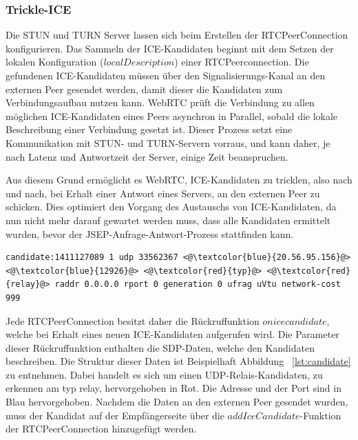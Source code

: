 \subsubsection{Trickle-ICE}
Die \acs{STUN} und \acs{TURN} Server lassen sich beim Erstellen der RTCPeerConnection konfigurieren. Das Sammeln der \acs{ICE}-Kandidaten beginnt mit dem Setzen der lokalen Konfiguration ($localDescription$) einer RTCPeerconnection. Die gefundenen \acs{ICE}-Kandidaten müssen über den Signalisierungs-Kanal an den externen Peer gesendet werden, damit dieser die Kandidaten zum Verbindungsaufbau nutzen kann. \acs{WebRTC} prüft die Verbindung zu allen möglichen \acs{ICE}-Kandidaten eines Peers asynchron in Parallel, sobald die lokale Beschreibung einer Verbindung gesetzt ist. Dieser Prozess setzt eine Kommunikation mit \acs{STUN}- und \acs{TURN}-Servern vorraus, und kann daher, je nach Latenz und Antwortzeit der Server, einige Zeit beanspruchen.\par

Aus diesem Grund ermöglicht es \acs{WebRTC}, \acs{ICE}-Kandidaten zu \glqq{}tricklen\grqq{}, also nach und nach, bei Erhalt einer Antwort eines Servers, an den externen Peer zu schicken. Dies optimiert den Vorgang des Austauschs von \acs{ICE}-Kandidaten, da nun nicht mehr darauf gewartet werden muss, dass alle Kandidaten ermittelt wurden, bevor der \acs{JSEP}-Anfrage-Antwort-Prozess stattfinden kann.\par

\vspace{1pc}
\begin{lstlisting}[caption={SDP-Datenstring eines Relais-ICE-Kandidaten},captionpos=b,label={lst:candidate}]
candidate:1411127089 1 udp 33562367 <@\textcolor{blue}{20.56.95.156}@> <@\textcolor{blue}{12926}@> <@\textcolor{red}{typ}@> <@\textcolor{red}{relay}@> raddr 0.0.0.0 rport 0 generation 0 ufrag uVtu network-cost 999
\end{lstlisting}

Jede RTCPeerConnection besitzt daher die Rückruffunktion \glqq{}$onicecandidate$\grqq{}, welche bei Erhalt eines neuen \acs{ICE}-Kandidaten aufgerufen wird. Die Parameter dieser Rückruffunktion enthalten die \acs{SDP}-Daten, welche den Kandidaten beschreiben. Die Struktur dieser Daten ist Beispielhaft Abbildung ~\ref{lst:candidate} zu entnehmen. Dabei handelt es sich um einen \acs{UDP}-Relais-Kandidaten, zu erkennen am \glqq{}typ relay\grqq{}, hervorgehoben in Rot. Die Adresse und der Port sind in Blau hervorgehoben. Nachdem die Daten an den externen Peer gesendet wurden, muss der Kandidat auf der Empfängerseite über die $addIceCandidate$-Funktion der RTCPeerConnection hinzugefügt werden.

